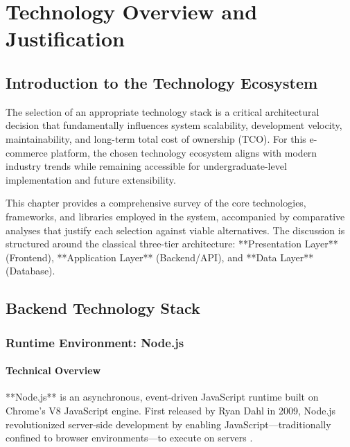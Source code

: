 
\chapter{Technology Overview and Justification}

\section{Introduction to the Technology Ecosystem}

The selection of an appropriate technology stack is a critical architectural decision that fundamentally influences system scalability, development velocity, maintainability, and long-term total cost of ownership (TCO). For this e-commerce platform, the chosen technology ecosystem aligns with modern industry trends while remaining accessible for undergraduate-level implementation and future extensibility.

This chapter provides a comprehensive survey of the core technologies, frameworks, and libraries employed in the system, accompanied by comparative analyses that justify each selection against viable alternatives. The discussion is structured around the classical three-tier architecture: **Presentation Layer** (Frontend), **Application Layer** (Backend/API), and **Data Layer** (Database).

\section{Backend Technology Stack}

\subsection{Runtime Environment: Node.js}

\subsubsection{Technical Overview}

**Node.js** is an asynchronous, event-driven JavaScript runtime built on Chrome's V8 JavaScript engine. First released by Ryan Dahl in 2009, Node.js revolutionized server-side development by enabling JavaScript—traditionally confined to browser environments—to execute on servers \cite{nodejs2024}.


